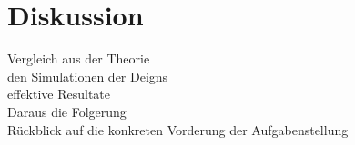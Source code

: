 \chapter{Diskussion}
Vergleich aus der Theorie\\
den Simulationen der Deigns\\
effektive Resultate\\

Daraus die Folgerung\\

Rückblick auf die konkreten Vorderung der Aufgabenstellung
